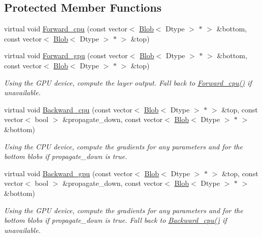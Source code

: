 \subsection*{Protected Member Functions}
\begin{DoxyCompactItemize}
\item 
virtual void \hyperlink{classcaffe_1_1DropoutLayer_a0216a90061f76314ad9cbcff9a30de8c}{Forward\+\_\+cpu} (const vector$<$ \hyperlink{classcaffe_1_1Blob}{Blob}$<$ Dtype $>$ $\ast$ $>$ \&bottom, const vector$<$ \hyperlink{classcaffe_1_1Blob}{Blob}$<$ Dtype $>$ $\ast$ $>$ \&top)
\item 
virtual void \hyperlink{classcaffe_1_1DropoutLayer_ac5aa2af956f5860729cc168c71eaee06}{Forward\+\_\+gpu} (const vector$<$ \hyperlink{classcaffe_1_1Blob}{Blob}$<$ Dtype $>$ $\ast$ $>$ \&bottom, const vector$<$ \hyperlink{classcaffe_1_1Blob}{Blob}$<$ Dtype $>$ $\ast$ $>$ \&top)\hypertarget{classcaffe_1_1DropoutLayer_ac5aa2af956f5860729cc168c71eaee06}{}\label{classcaffe_1_1DropoutLayer_ac5aa2af956f5860729cc168c71eaee06}

\begin{DoxyCompactList}\small\item\em Using the G\+PU device, compute the layer output. Fall back to \hyperlink{classcaffe_1_1DropoutLayer_a0216a90061f76314ad9cbcff9a30de8c}{Forward\+\_\+cpu()} if unavailable. \end{DoxyCompactList}\item 
virtual void \hyperlink{classcaffe_1_1DropoutLayer_a867367c03a4ddada547c6f5d663cdc73}{Backward\+\_\+cpu} (const vector$<$ \hyperlink{classcaffe_1_1Blob}{Blob}$<$ Dtype $>$ $\ast$ $>$ \&top, const vector$<$ bool $>$ \&propagate\+\_\+down, const vector$<$ \hyperlink{classcaffe_1_1Blob}{Blob}$<$ Dtype $>$ $\ast$ $>$ \&bottom)\hypertarget{classcaffe_1_1DropoutLayer_a867367c03a4ddada547c6f5d663cdc73}{}\label{classcaffe_1_1DropoutLayer_a867367c03a4ddada547c6f5d663cdc73}

\begin{DoxyCompactList}\small\item\em Using the C\+PU device, compute the gradients for any parameters and for the bottom blobs if propagate\+\_\+down is true. \end{DoxyCompactList}\item 
virtual void \hyperlink{classcaffe_1_1DropoutLayer_a94686dbe949aee8316e905cc1d0dde2e}{Backward\+\_\+gpu} (const vector$<$ \hyperlink{classcaffe_1_1Blob}{Blob}$<$ Dtype $>$ $\ast$ $>$ \&top, const vector$<$ bool $>$ \&propagate\+\_\+down, const vector$<$ \hyperlink{classcaffe_1_1Blob}{Blob}$<$ Dtype $>$ $\ast$ $>$ \&bottom)\hypertarget{classcaffe_1_1DropoutLayer_a94686dbe949aee8316e905cc1d0dde2e}{}\label{classcaffe_1_1DropoutLayer_a94686dbe949aee8316e905cc1d0dde2e}

\begin{DoxyCompactList}\small\item\em Using the G\+PU device, compute the gradients for any parameters and for the bottom blobs if propagate\+\_\+down is true. Fall back to \hyperlink{classcaffe_1_1DropoutLayer_a867367c03a4ddada547c6f5d663cdc73}{Backward\+\_\+cpu()} if unavailable. \end{DoxyCompactList}\end{DoxyCompactItemize}
